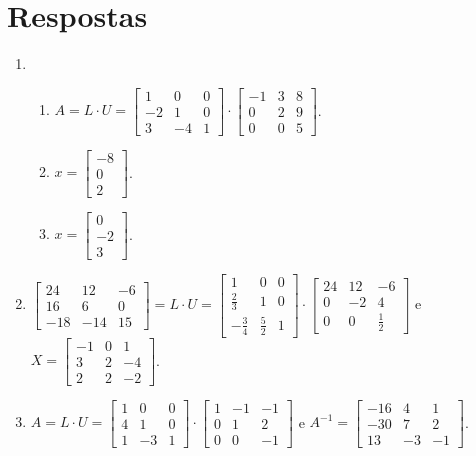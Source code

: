 \documentclass[12pt,a4paper]{article}
\begin{document}
\section*{Respostas}
\begin{enumerate}
\item
\begin{enumerate}
\item $A = L \cdot U =
\begin{bmatrix}
 1 &  0 & 0 \\
-2 &  1 & 0 \\
 3 & -4 & 1
\end{bmatrix}
\cdot
\begin{bmatrix}
-1 & 3 & 8 \\
 0 & 2 & 9 \\
 0 & 0 & 5
\end{bmatrix}
$.

\item
$ x = \begin{bmatrix}
-8 \\ 0 \\ 2
\end{bmatrix}$.
\item
$ x = \begin{bmatrix}
0 \\ -2 \\ 3
\end{bmatrix}$.
\end{enumerate}

\item $\begin{bmatrix}
 24 &  12 & -6\\
 16 &   6 &  0\\
-18 & -14 & 15
\end{bmatrix}
=L \cdot U =
\begin{bmatrix}
1&0&0\\
\frac{2}{3}&1&0\\
-\frac{3}{4}&\frac{5}{2}&1
\end{bmatrix}
\cdot
\begin{bmatrix}
24&12&-6\\
0&-2&4\\
0&0&\frac{1}{2}
\end{bmatrix}$
e
$X = \begin{bmatrix}
-1&0&1\\
3&2&-4\\
2&2&-2
\end{bmatrix}$.

\item $A = L \cdot U =
\begin{bmatrix}
1&0&0\\4&1&0\\1&-3&1
\end{bmatrix}
\cdot
\begin{bmatrix}
1&-1&-1\\0&1&2\\0&0&-1
\end{bmatrix}$
e
$A^{-1} = \begin{bmatrix}
-16&4&1\\
-30&7&2\\
13&-3&-1
\end{bmatrix}$.


\end{enumerate}
\end{document}
